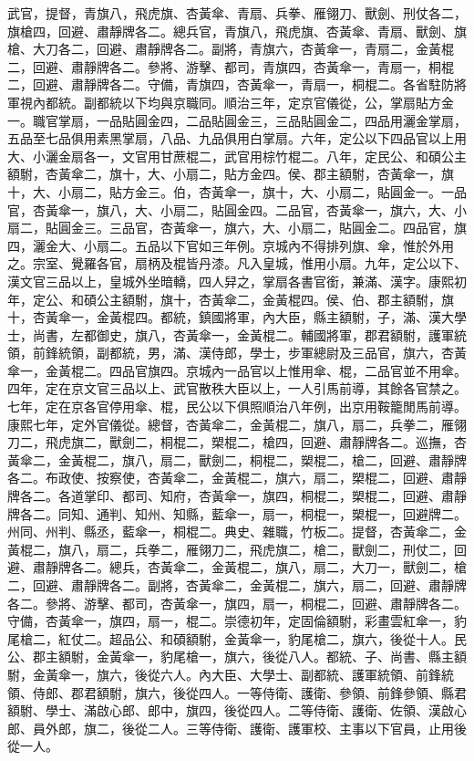 \begin{pinyinscope}
武官，提督，青旗八，飛虎旗、杏黃傘、青扇、兵拳、雁翎刀、獸劍、刑仗各二，旗槍四，回避、肅靜牌各二。總兵官，青旗八，飛虎旗、杏黃傘、青扇、獸劍、旗槍、大刀各二，回避、肅靜牌各二。副將，青旗六，杏黃傘一，青扇二，金黃棍二，回避、肅靜牌各二。參將、游擊、都司，青旗四，杏黃傘一，青扇一，桐棍二，回避、肅靜牌各二。守備，青旗四，杏黃傘一，青扇一，桐棍二。各省駐防將軍視內都統。副都統以下均與京職同。順治三年，定京官儀從，公，掌扇貼方金一。職官掌扇，一品貼圓金四，二品貼圓金三，三品貼圓金二，四品用灑金掌扇，五品至七品俱用素黑掌扇，八品、九品俱用白掌扇。六年，定公以下四品官以上用大、小灑金扇各一，文官用甘蔗棍二，武官用棕竹棍二。八年，定民公、和碩公主額駙，杏黃傘二，旗十，大、小扇二，貼方金四。侯、郡主額駙，杏黃傘一，旗十，大、小扇二，貼方金三。伯，杏黃傘一，旗十，大、小扇二，貼圓金一。一品官，杏黃傘一，旗八，大、小扇二，貼圓金四。二品官，杏黃傘一，旗六，大、小扇二，貼圓金三。三品官，杏黃傘一，旗六，大、小扇二，貼圓金二。四品官，旗四，灑金大、小扇二。五品以下官如三年例。京城內不得排列旗、傘，惟於外用之。宗室、覺羅各官，扇柄及棍皆丹漆。凡入皇城，惟用小扇。九年，定公以下、漢文官三品以上，皇城外坐暗轎，四人舁之，掌扇各書官銜，兼滿、漢字。康熙初年，定公、和碩公主額駙，旗十，杏黃傘二，金黃棍四。侯、伯、郡主額駙，旗十，杏黃傘一，金黃棍四。都統，鎮國將軍，內大臣，縣主額駙，子，滿、漢大學士，尚書，左都御史，旗八，杏黃傘一，金黃棍二。輔國將軍，郡君額駙，護軍統領，前鋒統領，副都統，男，滿、漢侍郎，學士，步軍總尉及三品官，旗六，杏黃傘一，金黃棍二。四品官旗四。京城內一品官以上惟用傘、棍，二品官並不用傘。四年，定在京文官三品以上、武官散秩大臣以上，一人引馬前導，其餘各官禁之。七年，定在京各官停用傘、棍，民公以下俱照順治八年例，出京用鞍籠閒馬前導。康熙七年，定外官儀從。總督，杏黃傘二，金黃棍二，旗八，扇二，兵拳二，雁翎刀二，飛虎旗二，獸劍二，桐棍二，槊棍二，槍四，回避、肅靜牌各二。巡撫，杏黃傘二，金黃棍二，旗八，扇二，獸劍二，桐棍二，槊棍二，槍二，回避、肅靜牌各二。布政使、按察使，杏黃傘二，金黃棍二，旗六，扇二，槊棍二，回避、肅靜牌各二。各道掌印、都司、知府，杏黃傘一，旗四，桐棍二，槊棍二，回避、肅靜牌各二。同知、通判、知州、知縣，藍傘一，扇一，桐棍一，槊棍一，回避牌二。州同、州判、縣丞，藍傘一，桐棍二。典史、雜職，竹板二。提督，杏黃傘二，金黃棍二，旗八，扇二，兵拳二，雁翎刀二，飛虎旗二，槍二，獸劍二，刑仗二，回避、肅靜牌各二。總兵，杏黃傘二，金黃棍二，旗八，扇二，大刀一，獸劍二，槍二，回避、肅靜牌各二。副將，杏黃傘二，金黃棍二，旗六，扇二，回避、肅靜牌各二。參將、游擊、都司，杏黃傘一，旗四，扇一，桐棍二，回避、肅靜牌各二。守備，杏黃傘一，旗四，扇一，棍二。崇德初年，定固倫額駙，彩畫雲紅傘一，豹尾槍二，紅仗二。超品公、和碩額駙，金黃傘一，豹尾槍二，旗六，後從十人。民公、郡主額駙，金黃傘一，豹尾槍一，旗六，後從八人。都統、子、尚書、縣主額駙，金黃傘一，旗六，後從六人。內大臣、大學士、副都統、護軍統領、前鋒統領、侍郎、郡君額駙，旗六，後從四人。一等侍衛、護衛、參領、前鋒參領、縣君額駙、學士、滿啟心郎、郎中，旗四，後從四人。二等侍衛、護衛、佐領、漢啟心郎、員外郎，旗二，後從二人。三等侍衛、護衛、護軍校、主事以下官員，止用後從一人。


\end{pinyinscope}